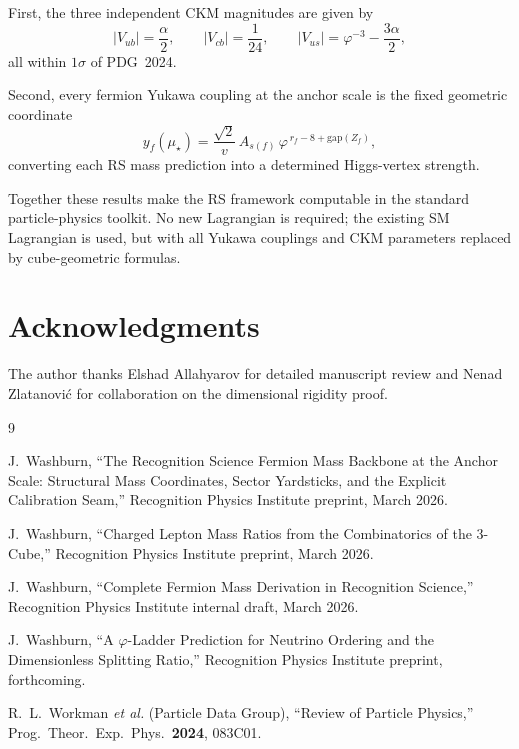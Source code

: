 \documentclass[11pt]{article}
\theoremstyle{remark}
\newcommand{\phig}{\varphi}
\newcommand{\mustar}{\mu_\star}
\begin{document}
First, the three independent CKM magnitudes are given by
\[
  |V_{ub}| = \frac{\alpha}{2},
  \qquad
  |V_{cb}| = \frac{1}{24},
  \qquad
  |V_{us}| = \phig^{-3} - \frac{3\alpha}{2},
\]
all within $1\sigma$ of PDG~2024.

Second, every fermion Yukawa coupling at the anchor scale is
the fixed geometric coordinate
\[
  y_f(\mustar)
  = \frac{\sqrt{2}}{v}\,
    A_{s(f)}\,\phig^{\,r_f - 8 + \mathrm{gap}(Z_f)},
\]
converting each RS mass prediction into a determined
Higgs-vertex strength.

Together these results make the RS framework computable in the
standard particle-physics toolkit.  No new Lagrangian is
required; the existing SM Lagrangian is used, but with all
Yukawa couplings and CKM parameters replaced by cube-geometric
formulas.

\section*{Acknowledgments}

The author thanks Elshad Allahyarov for detailed manuscript
review and Nenad Zlatanovi\'{c} for collaboration on the
dimensional rigidity proof.

\begin{thebibliography}{9}

J.~Washburn,
``The Recognition Science Fermion Mass Backbone at the Anchor Scale:
Structural Mass Coordinates, Sector Yardsticks, and the Explicit
Calibration Seam,''
Recognition Physics Institute preprint, March 2026.

J.~Washburn,
``Charged Lepton Mass Ratios from the Combinatorics of the 3-Cube,''
Recognition Physics Institute preprint, March 2026.

J.~Washburn,
``Complete Fermion Mass Derivation in Recognition Science,''
Recognition Physics Institute internal draft, March 2026.

J.~Washburn,
``A $\phig$-Ladder Prediction for Neutrino Ordering and the
Dimensionless Splitting Ratio,''
Recognition Physics Institute preprint, forthcoming.

R.~L.~Workman \textit{et al.} (Particle Data Group),
``Review of Particle Physics,''
Prog.\ Theor.\ Exp.\ Phys.\ \textbf{2024}, 083C01.

\end{thebibliography}
\end{document}
